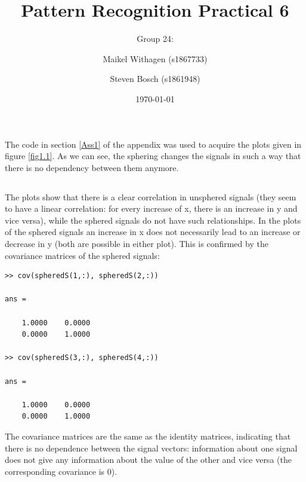 \documentclass[10pt]{article}
\title{Pattern Recognition Practical 6}
\author{Group 24: \and Maikel Withagen (s1867733) \and Steven Bosch (s1861948)}
\date{\today}
\begin{document}
\maketitle

\section{}
\subsection{}
The code in section \ref{Ass1} of the appendix was used to acquire the plots given in figure \ref{fig1.1}. As we can see, the sphering changes the signals in such a way that there is no dependency between them anymore.

\subsection{}
The plots show that there is a clear correlation in unsphered signals (they seem to have a linear correlation: for every increase of x, there is an increase in y and vice versa), while the sphered signals do not have such relationships. In the plots of the sphered signals an increase in x does not necessarily lead to an increase or decrease in y (both are possible in either plot).
This is confirmed by the covariance matrices of the sphered signals:
\begin{lstlisting}
>> cov(spheredS(1,:), spheredS(2,:))

ans =

    1.0000    0.0000
    0.0000    1.0000

>> cov(spheredS(3,:), spheredS(4,:))

ans =

    1.0000    0.0000
    0.0000    1.0000
\end{lstlisting}
The covariance matrices are the same as the identity matrices, indicating that there is no dependence between the signal vectors: information about one signal does not give any information about the value of the other and vice versa (the corresponding covariance is 0).
\end{document}
